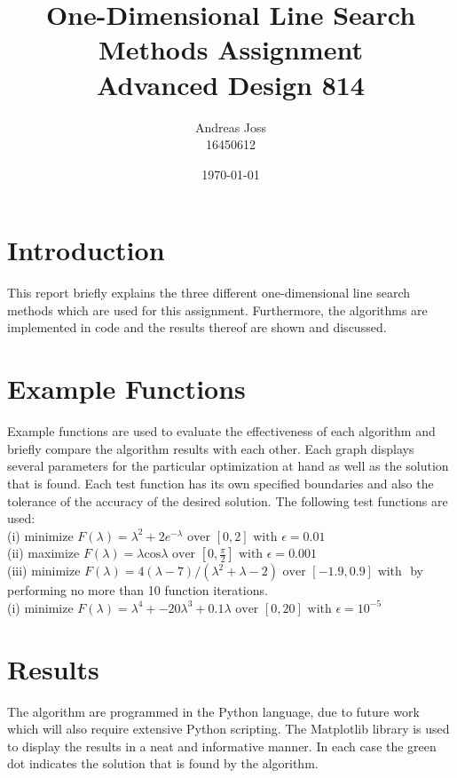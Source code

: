 \documentclass[a4paper,10pt]{article}
\title{\Huge{One-Dimensional Line Search Methods Assignment}\\[7cm]Advanced Design 814\\[2cm]}
\author{\Large Andreas Joss\\[0.5cm]16450612}
\date{\today}
\begin{document}
\maketitle


\newpage
\section{Introduction}
This report briefly explains the  three different one-dimensional line search methods which are used for this assignment. Furthermore, the algorithms are implemented in code and the results thereof are shown and discussed. 

\section{Example Functions}
Example functions are used to evaluate the effectiveness of each algorithm and briefly compare the algorithm results with each other. Each graph displays several parameters for the particular optimization at hand as well as the solution that is found. Each test function has its own specified boundaries and also the tolerance of the accuracy of the desired solution. The following test functions are used:
\\[0.5cm]
(i) minimize $F(\lambda) = \lambda^{2} + 2e^{-\lambda} \text{ over } [0,2] \text{ with } \epsilon = 0.01$
\\[0.5cm]
(ii) maximize $F(\lambda) = \lambda \text{cos} \lambda \text{ over } [0,\frac{\pi}{2}] \text{ with } \epsilon = 0.001$
\\[0.5cm]
(iii) minimize $F(\lambda) = 4(\lambda - 7) / (\lambda^{2} + \lambda - 2) \text{ over } [-1.9,0.9] \text{ with }$ by performing no more than 10 function iterations.
\\[0.5cm]
(i) minimize $F(\lambda) = \lambda^{4} + -20\lambda^{3} + 0.1\lambda \text{ over } [0,20] \text{ with } \epsilon = 10^{-5}$

\section{Results}
The algorithm are programmed in the Python language, due to future work which will also require extensive Python scripting. The Matplotlib library is used to display the results in a neat and informative manner. In each case the green dot indicates the solution that is found by the algorithm.

\newpage
\end{document}
